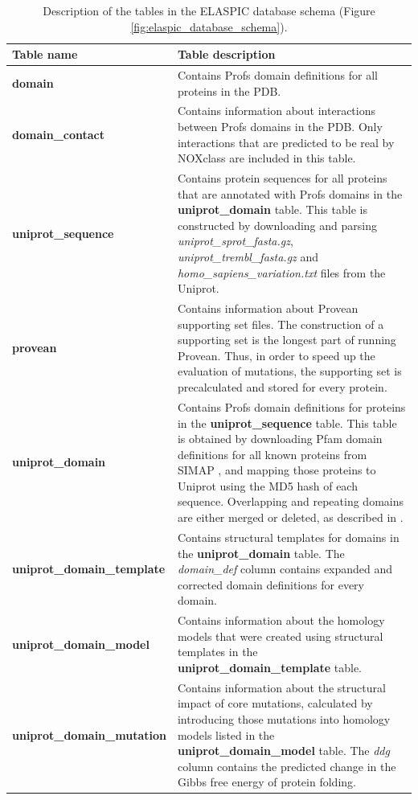 \begin{table}[!tb]
\caption[ELASPIC database schema.]{Description of the tables in the ELASPIC database schema (Figure \ref{fig:elaspic_database_schema}).} \label{tab:elaspic_database_schema}
\begin{tabular}{l | p{10cm}}
	\toprule
	Table name & Table description \\
	\midrule
	\textbf{domain} & Contains Profs domain definitions for all proteins in the PDB. \\
	\textbf{domain\_contact} & Contains information about interactions between Profs domains in the PDB. Only interactions that are predicted to be real by NOXclass \cite{zhu_noxclass:_2006} are included in this table. \\
	\textbf{uniprot\_sequence} & Contains protein sequences for all proteins that are annotated with Profs domains in the \textbf{uniprot\_domain} table. This table is constructed by downloading and parsing \textit{uniprot\_sprot\_fasta.gz}, \textit{uniprot\_trembl\_fasta.gz} and \textit{homo\_sapiens\_variation.txt} files from the Uniprot. \\
	\textbf{provean} & Contains information about Provean \cite{choi_predicting_2012} supporting set files. The construction of a supporting set is the longest part of running Provean. Thus, in order to speed up the evaluation of mutations, the supporting set is precalculated and stored for every protein. \\
	\textbf{uniprot\_domain} & Contains Profs domain definitions for proteins in the \textbf{uniprot\_sequence} table. This table is obtained by downloading Pfam domain definitions for all known proteins from SIMAP \cite{rattei_simapcomprehensive_2010}, and mapping those proteins to Uniprot using the MD5 hash of each sequence. Overlapping and repeating domains are either merged or deleted, as described in \cite{witvliet_elaspic_2016}. \\
	\textbf{uniprot\_domain\_template} & Contains structural templates for domains in the \textbf{uniprot\_domain} table. The \textit{domain\_def} column contains expanded and corrected domain definitions for every domain. \\
	\textbf{uniprot\_domain\_model} & Contains information about the homology models that were created using structural templates in the \textbf{uniprot\_domain\_template} table. \\
	\textbf{uniprot\_domain\_mutation} & Contains information about the structural impact of core mutations, calculated by introducing those mutations into homology models listed in the \textbf{uniprot\_domain\_model} table. The \textit{ddg} column contains the predicted change in the Gibbs free energy of protein folding. \\

\end{tabular}
\end{table}
